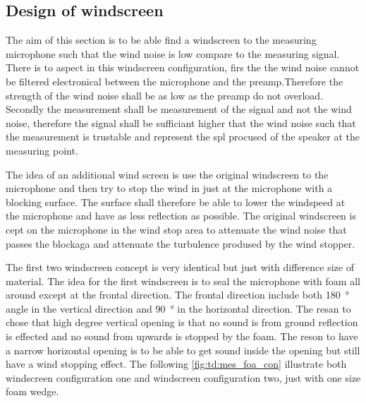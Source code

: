 \subsection{Design of windscreen}
The aim of this section is to be able find a windscreen to the measuring microphone such that the wind noise is low compare to the measuring signal. There is to aspect in this windscreen configuration, firs the the wind noise cannot be filtered electronical between the microphone and the preamp.Therefore the strength of the wind noise shall be as low as the preamp do not overload. Secondly the measurement shall be measurement of the signal and not the wind noise, therefore the signal shall be sufficiant higher that the wind noise such that the measurement is trustable and represent the \gls{spl} procused of the speaker at the measuring point. 

The idea of an additional wind screen is use the original windscreen to the microphone and then try to stop the wind in just at the microphone with a blocking surface. The surface shall therefore be able to lower the windspeed at the microphone and have as less reflection as possible. The original windscreen is cept on the microphone in the wind stop area to attenuate the wind noise that passes the blockaga and attenuate the turbulence prodused by the wind stopper. 

    
    
The first two windscreen concept is very identical but just with difference size of material. The idea for the first windscreen is to seal the microphone with foam all around except at the frontal direction. The frontal direction include both \SI{180}{\degree} angle in the vertical direction and \SI{90}{\degree} in the horizontal direction. The resan to chose that high degree vertical opening is that no sound is from ground reflection is effected and no sound from upwards is stopped by the foam. The reson to have a narrow horizontal  opening is to be able to get sound inside the opening but still have a wind stopping effect. The following \autoref{fig:td:mes_foa_con} illustrate both windscreen configuration one and windscreen configuration two, just with one size foam wedge.
    

